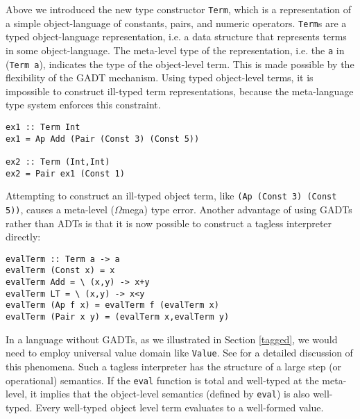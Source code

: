 \documentclass[11pt,twoside,A4]{llncs}
\newcommand{\om}{\emph{$\Omega$}mega}
\begin{document}
Above we introduced the new type constructor {\tt Term}, which is a
representation of a simple object-language of constants, pairs, and numeric
operators. 
{\tt Term}s are a typed object-language representation, i.e. a data
structure that represents terms in some object-language. The meta-level
type of the representation, i.e. the {\tt a} in ({\tt Term a}), indicates the type 
of the object-level term. This is made possible by the flexibility of
the GADT mechanism. Using typed object-level terms,
it is impossible to construct ill-typed term representations, because
the meta-language type system enforces this constraint.

{\small
\begin{verbatim}
ex1 :: Term Int  
ex1 = Ap Add (Pair (Const 3) (Const 5))

ex2 :: Term (Int,Int)
ex2 = Pair ex1 (Const 1)
\end{verbatim}}
Attempting to construct an ill-typed object term, like {\tt (Ap (Const 3) (Const 5))},
causes a meta-level (\om) type error. Another advantage of using
GADTs rather than ADTs is that it is now possible to construct a 
tagless\cite{SheardPasalic2002,Taha:2001:TEJ,TahaTag2000}
interpreter directly:

{\small
\begin{verbatim}
evalTerm :: Term a -> a
evalTerm (Const x) = x
evalTerm Add = \ (x,y) -> x+y
evalTerm LT = \ (x,y) -> x<y
evalTerm (Ap f x) = evalTerm f (evalTerm x)
evalTerm (Pair x y) = (evalTerm x,evalTerm y)
\end{verbatim}}
In a language without GADTs, as we illustrated
in Section \ref{tagged}, we would need to employ universal value domain like
{\tt Value}. See \cite{PasalicLingerGpce} 
for a detailed discussion of this phenomena. Such a tagless interpreter
has the structure of a large step (or operational) semantics. If the {\tt eval}
function is total and well-typed at the meta-level, it implies
that the object-level semantics (defined by {\tt eval}) is also well-typed.
Every well-typed object level term evaluates to a well-formed value.
\end{document}
